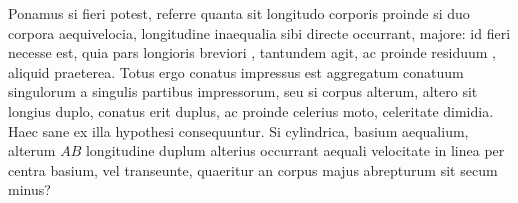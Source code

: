 \pstart \noindent Ponamus si fieri potest, referre quanta sit longitudo corporis  proinde si duo corpora aequivelocia\protect{}, longitudine inaequalia sibi directe occurrant,  majore: id fieri necesse est, quia pars longioris   breviori , tantundem agit, ac proinde residuum , aliquid praeterea. Totus ergo conatus impressus\protect{} est aggregatum conatuum singulorum\protect{} a singulis partibus impressorum, seu si corpus alterum, altero sit longius duplo, conatus\protect{} erit duplus, ac proinde  celerius moto, celeritate dimidia. Haec sane ex illa hypothesi consequuntur.
\pend 
\pstart Si  cylindrica\protect{}, basium  aequalium, alterum $AB$ longitudine duplum alterius   occurrant aequali velocitate in linea per centra basium, vel  transeunte, quaeritur an corpus majus abrepturum sit secum minus? 
\pend 

